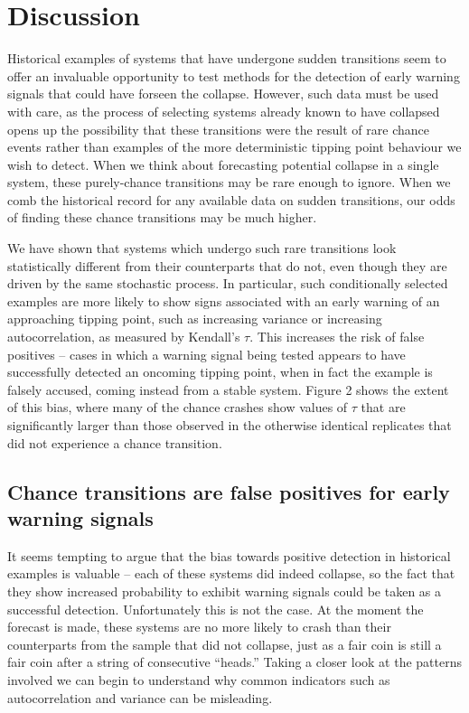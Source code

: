 \documentclass[authoryear,review,12pt]{elsarticle}
\begin{document}
\section{Discussion}

Historical examples of systems that have undergone sudden transitions seem
to offer an invaluable opportunity to test methods for the detection of
early warning signals that could have forseen the collapse.  However,
such data must be used with care, as the process of selecting systems
already known to have collapsed opens up the possibility that these
transitions were the result of rare chance events rather than examples
of the more deterministic tipping point behaviour we wish to detect.
When we think about forecasting potential collapse in a single system,
these purely-chance transitions may be rare enough to ignore.  When we
comb the historical record for any available data on sudden transitions,
our odds of finding these chance transitions may be much higher.

We have shown that systems which undergo such rare transitions look
statistically different from their counterparts that do not, even though
they are driven by the same stochastic process.  In particular, such
conditionally selected examples are more likely to show signs associated
with an early warning of an approaching tipping point, such as increasing
variance or increasing autocorrelation, as measured by Kendall's $\tau$.
This increases the risk of false positives -- cases in which a warning
signal being tested appears to have successfully detected an oncoming
tipping point, when in fact the example is falsely accused, coming
instead from a stable system. Figure 2 shows the extent of this bias,
where many of the chance crashes show values of $\tau$ that are 
significantly larger than those observed in the otherwise identical
replicates that did not experience a chance transition.  


\subsection{Chance transitions are false positives for early warning signals}

It seems tempting to argue that the bias towards positive detection
in historical examples is valuable -- each of these systems did
indeed collapse, so the fact that they show increased probability
to exhibit warning signals could be taken as a successful detection.
Unfortunately this is not the case. At the moment the forecast is made,
these systems are no more likely to crash than their counterparts from
the sample that did not collapse, just as a fair coin is still a fair
coin after a string of consecutive ``heads.''  Taking a closer look at
the patterns involved we can begin to understand why common indicators
such as autocorrelation and variance can be misleading.
\end{document}
